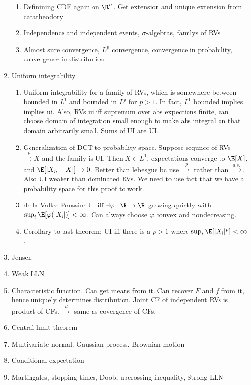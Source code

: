 \documentclass[12pt]{article}
\theoremstyle{plain}
\theoremstyle{definition}
\theoremstyle{remark}
\newcommand{\ra}{\rightarrow}
\newcommand{\asto}{\xrightarrow{a.s.}}
\newcommand{\pto}{\xrightarrow{p}}
\newcommand{\dto}{\xrightarrow{d}}
\begin{document}
\begin{enumerate}
\begin{enumerate}
      \item Definining CDF again on $\R^n$. Get extension and unique
        extension from caratheodory
      \item
        Independence and independent events, $\sigma$-algebras, familys
        of RVs

      \item Almost sure convergence, $L^p$ convergence, convergence in
        probability, convergence in distribution
    \end{enumerate}

  \item Uniform integrability
    \begin{enumerate}
      \item Uniform integrability for a family of RVs, which is somewhere
        between bounded in $L^1$ and bounded in $L^p$ for $p>1$.
        In fact, $L^1$ bounded implies implies ui.
        Also, RVs ui iff supremum over abs expections finite, can choose
        domain of integration small enough to make abs integral on that
        domain arbitrarily small.
        Sums of UI are UI.
      \item Generalization of DCT to probability space. Suppose sequnce of
        RVs $\pto X$ and the family is UI. Then $X\in L^1$, expectations
        converge to $\E[X]$, and $\E[|X_n-X|]\ra0$.
        Better than lebesgue bc use $\pto$ rather than $\asto$.
        Also UI weaker than dominated RVs. We need to use fact that we have
        a probability space for this proof to work.
      \item de la Vallee Poussin:
        UI iff $\exists\varphi:\R\ra\R$ growing quickly with
        $\sup_i \E[\varphi(|X_i|)]<\infty$. Can always choose $\varphi$
        convex and nondecreasing.
      \item Corollary to last theorem: UI iff there is a $p>1$ where
        $\sup_i\E[|X_i|^p]<\infty$.
    \end{enumerate}

  \item Jensen
  \item Weak LLN
  \item Characteristic function. Can get means from it.
    Can recover $F$ and $f$ from it, hence uniquely determines
    distribution. Joint CF of independent RVs is product of CFs.
    $\dto$ same as covergence of CFs.
  \item Central limit theorem

  \item Multivariate normal. Gaussian process.
    Brownian motion

  \item Conditional expectation
  \item Martingales, stopping times, Doob, upcrossing inequality, Strong
    LLN

\end{enumerate}
\end{document}
